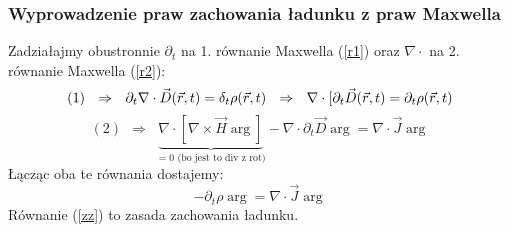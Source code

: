 \subsubsection{Wyprowadzenie praw zachowania ładunku z praw Maxwella}
Zadziałajmy obustronnie $\partial_t$ na 1. równanie Maxwella (\ref{r1}) oraz $\nabla\cdot$ na 2. równanie Maxwella (\ref{r2}):
\begin{equation}
(1)~~\Rightarrow ~~\partial_t \nabla\cdot \vec{D}(\vec{r},t)=\delta_t \rho(\vec{r},t) ~~\Rightarrow~~ \nabla\cdot[\partial_t\vec{D}(\vec{r},t)=\partial_t\rho(\vec{r},t) \end{equation}
 \begin{equation}
 (2)~~\Rightarrow~~ \underbrace{\nabla\cdot[\nabla\times\vec{H}\arg]}_{=0 \text{ (bo jest to div z rot)}}-\nabla\cdot\partial_t\vec{D}\arg=\nabla\cdot\vec{J}\arg
\end{equation}
Łącząc oba te równania dostajemy:
\begin{equation}
-\partial_t\rho\arg=\nabla\cdot\vec{J}\arg \label{zz}
\end{equation}
Równanie (\ref{zz}) to zasada zachowania ładunku.

